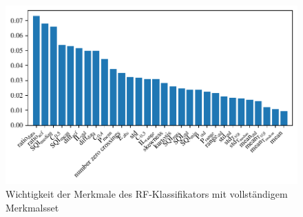 \begin{figure}[H]
	\centering
	\includegraphics[scale=0.95]{pic/rf-clf-all-importances.pdf}
 	\caption{Wichtigkeit der Merkmale des \ac{RF}-Klassifikators mit vollständigem Merkmalsset}
 	\label{fig:rf-clf-all-importances}
\end{figure}


